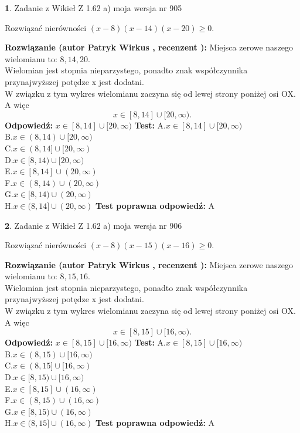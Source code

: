 \documentclass[12pt, a4paper]{article}
\theoremstyle{definition} %
\newtheorem{zad}{}
\newcommand{\zadStart}[1]{\begin{zad}#1\newline}
\newcommand{\zadStop}{\end{zad}}
\newcommand{\rozwStart}[2]{\noindent \textbf{Rozwiązanie (autor #1 , recenzent #2): }\newline}
\newcommand{\rozwStop}{\newline}
\newcommand{\odpStart}{\noindent \textbf{Odpowiedź:}\newline}
\newcommand{\odpStop}{\newline}
\newcommand{\testStart}{\noindent \textbf{Test:}\newline}
\newcommand{\testStop}{\newline}
\newcommand{\kluczStart}{\noindent \textbf{Test poprawna odpowiedź:}\newline}
\newcommand{\kluczStop}{\newline}
\begin{document}
\zadStart{Zadanie z Wikieł Z 1.62 a) moja wersja nr 905}

Rozwiązać nierówności $(x-8)(x-14)(x-20)\ge0$.
\zadStop
\rozwStart{Patryk Wirkus}{}
Miejsca zerowe naszego wielomianu to: $8, 14, 20$.\\
Wielomian jest stopnia nieparzystego, ponadto znak współczynnika przy\linebreak najwyższej potędze x jest dodatni.\\ W związku z tym wykres wielomianu zaczyna się od lewej strony poniżej osi OX. A więc $$x \in [8,14] \cup [20,\infty).$$
\rozwStop
\odpStart
$x \in [8,14] \cup [20,\infty)$
\odpStop
\testStart
A.$x \in [8,14] \cup [20,\infty)$\\
B.$x \in (8,14) \cup [20,\infty)$\\
C.$x \in (8,14] \cup [20,\infty)$\\
D.$x \in [8,14) \cup [20,\infty)$\\
E.$x \in [8,14] \cup (20,\infty)$\\
F.$x \in (8,14) \cup (20,\infty)$\\
G.$x \in [8,14) \cup (20,\infty)$\\
H.$x \in (8,14] \cup (20,\infty)$
\testStop
\kluczStart
A
\kluczStop



\zadStart{Zadanie z Wikieł Z 1.62 a) moja wersja nr 906}

Rozwiązać nierówności $(x-8)(x-15)(x-16)\ge0$.
\zadStop
\rozwStart{Patryk Wirkus}{}
Miejsca zerowe naszego wielomianu to: $8, 15, 16$.\\
Wielomian jest stopnia nieparzystego, ponadto znak współczynnika przy\linebreak najwyższej potędze x jest dodatni.\\ W związku z tym wykres wielomianu zaczyna się od lewej strony poniżej osi OX. A więc $$x \in [8,15] \cup [16,\infty).$$
\rozwStop
\odpStart
$x \in [8,15] \cup [16,\infty)$
\odpStop
\testStart
A.$x \in [8,15] \cup [16,\infty)$\\
B.$x \in (8,15) \cup [16,\infty)$\\
C.$x \in (8,15] \cup [16,\infty)$\\
D.$x \in [8,15) \cup [16,\infty)$\\
E.$x \in [8,15] \cup (16,\infty)$\\
F.$x \in (8,15) \cup (16,\infty)$\\
G.$x \in [8,15) \cup (16,\infty)$\\
H.$x \in (8,15] \cup (16,\infty)$
\testStop
\kluczStart
A
\kluczStop
\end{document}
